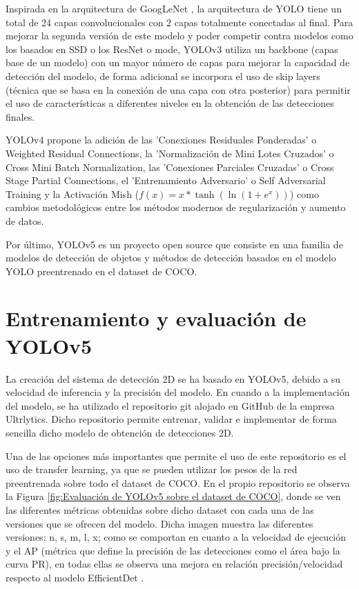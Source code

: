 Inspirada en la arquitectura de GoogLeNet \cite{GooLeNet}, la arquitectura de \ac{YOLO} tiene un total de 24 capas convolucionales con 2 capas totalmente conectadas al final. Para mejorar la segunda versión de este modelo y poder competir contra modelos como los basados en \ac{SSD} o los ResNet \cite{ResNet} o mode, YOLOv3 utiliza un backbone (capas base de un modelo) con un mayor número de capas para mejorar la capacidad de detección del modelo, de forma adicional se incorpora el uso de skip layers (técnica que se basa en la conexión de una capa con otra posterior) para permitir el uso de características a diferentes niveles en la obtención de las detecciones finales.

YOLOv4 propone la adición de las 'Conexiones Residuales Ponderadas' o Weighted  Residual Connections, la 'Normalización de Mini Lotes Cruzados' o Cross Mini Batch Normalization, las 'Conexiones Parciales Cruzadas' o Cross Stage Partial Connections, el 'Entrenamiento Adversario' o Self Adversarial Training y la Activación Mish ($f(x) = x * \tanh{(\ln{(1+e^x)})}$) como cambios metodológicos entre los métodos modernos de regularización y aumento de datos.

Por último, YOLOv5 es un proyecto open source que consiste en una familia de modelos de detección de objetos y métodos de detección basados en el modelo \ac{YOLO} preentrenado en el dataset de COCO.

\section{Entrenamiento y evaluación de YOLOv5}
\label{sec:Entrenamiento y evaluación de YOLOv5}

La creación del sistema de detección 2D se ha basado en YOLOv5, debido a su velocidad de inferencia y la precisión del modelo. En cuando a la implementación del modelo, se ha utilizado el repositorio git alojado en GitHub de la empresa Ultrlytics. Dicho repositorio permite entrenar, validar e implementar de forma sencilla dicho modelo de obtención de detecciones 2D.

Una de las opciones más importantes que permite el uso de este repositorio es el uso de transfer learning, ya que se pueden utilizar los pesos de la red preentrenada sobre todo el dataset de COCO. En el propio repositorio se observa la Figura \ref{fig:Evaluación de YOLOv5 sobre el dataset de COCO}, donde se ven las diferentes métricas obtenidas sobre dicho dataset con cada una de las versiones que se ofrecen del modelo. Dicha imagen muestra las diferentes versiones: n, s, m, l, x; como se comportan en cuanto a la velocidad de ejecución y el \ac{AP} (métrica que define la precisión de las detecciones como el área bajo la curva PR), en todas ellas se observa una mejora en relación precisión/velocidad respecto al modelo EfficientDet \cite{EfficientDet}.

